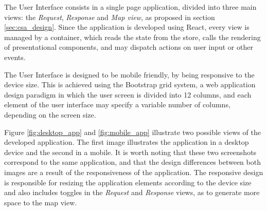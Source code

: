 The User Interface consists in a single page application, divided into three main views: the \textit{Request}, \textit{Response} and \textit{Map view}, as proposed in section \ref{sec:csa_design}. Since the application is developed using React, every view is managed by a container, which reads the state from the store, calls the rendering of presentational components, and may dispatch actions on user input or other events. 

The User Interface is designed to be mobile friendly, by being responsive to the  device size. This is achieved using the Bootstrap grid system, a web application design paradigm in which the user screen is divided into 12 columns, and each element of the user interface may specify a variable number of columns, depending on the screen size.

Figure \ref{fig:desktop_app} and \ref{fig:mobile_app} illustrate two possible views of the developed application. The first image illustrates the application in a desktop device and the second in a mobile. It is worth noting that these two screenshots correspond to the same application, and that the design differences between both images are a result of the responsiveness of the application. The responsive design is responsible for resizing the application elements according to the device size and also includes toggles in the \textit{Request} and \textit{Response} views, as to generate more space to the map view. 


